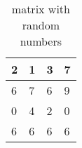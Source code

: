 \begin{table}[htbp]
\centering
\begin{tabular}{|l|l|l|l|}
\hline
2 & 1 & 3 & 7 \\ \hline
6 & 7 & 6 & 9 \\ \hline
0 & 4 & 2 & 0 \\ \hline
6 & 6 & 6 & 6 \\ \hline
\end{tabular}
\label{tab:tabelunia}
\caption{matrix with random numbers}
\end{table}